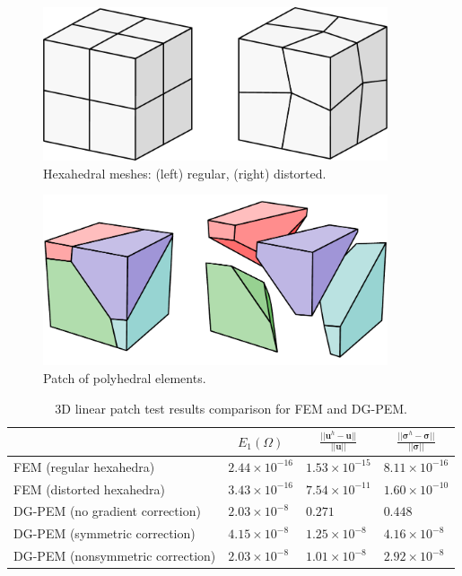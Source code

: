 \begin{figure}[!h]
    \centering
    \includegraphics[width=4.0in]{figures/hexahedral_patch_meshes.pdf}
    	\caption{Hexahedral meshes: (left) regular, (right) distorted.}
    \label{fig:hexahedral_patch_meshes}
\end{figure}

\begin{figure}[!h]
    \centering
    \includegraphics[width=4.0in]{figures/polyhedral_patch_mesh.pdf}
    	\caption{Patch of polyhedral elements.}
    \label{fig:polyhedral_patch_mesh}
\end{figure}

\begin{table}[!ht]
  \begin{center}
    \begin{tabular}{| l || l | l | l |}
    \hline
           & \multicolumn{1}{|c|}{$E_1 (\Omega)$} & \multicolumn{1}{|c|}{$\frac{||\bm{u}^h - \bm{u}||}{||\bm{u}||}$} & \multicolumn{1}{|c|}{$\frac{||\boldsymbol{\sigma}^h - \boldsymbol{\sigma}||}{||\boldsymbol{\sigma}||}$} \\ \hline \hline
    FEM (regular hexahedra) & $2.44 \times 10^{-16}$ & $1.53 \times 10^{-15}$ & $8.11 \times 10^{-16}$ \\ \hline
    FEM (distorted hexahedra) & $3.43 \times 10^{-16}$ & $7.54 \times 10^{-11}$ & $1.60 \times 10^{-10}$ \\ \hline
    DG-PEM (no gradient correction) & $2.03 \times 10^{-8}$ & $0.271$ & $0.448$ \\ \hline
    DG-PEM (symmetric correction) & $4.15 \times 10^{-8}$ & $1.25 \times 10^{-8}$ & $4.16 \times 10^{-8}$ \\ \hline
    DG-PEM (nonsymmetric correction) & $2.03 \times 10^{-8}$ & $1.01 \times 10^{-8}$ & $2.92 \times 10^{-8}$ \\
    \hline
    \end{tabular}
    \caption{3D linear patch test results comparison for FEM and DG-PEM.}
    \vspace{-5pt}
    \label{tab:linear_patch_test_3d}
    \vspace{-10pt}
  \end{center}
\end{table}

